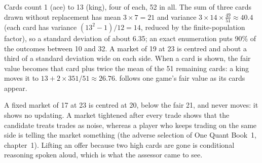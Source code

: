 \begin{example}\label{ex:iv:the-final-round-and-trading-games:cards}
Cards count 1 (ace) to 13 (king), four of each, 52 in all. The sum of three cards drawn without replacement
has mean $3 \times 7 = 21$ and variance $3 \times 14 \times \tfrac{49}{51} \approx 40.4$ (each card has
variance $(13^2 - 1)/12 = 14$, reduced by the finite-population factor), so a standard deviation of about 6.35;
an exact enumeration puts 90\% of the outcomes between 10 and 32. A market of 19 at 23 is centred and about a
third of a standard deviation wide on each side. When a card is shown, the fair value becomes that card plus
twice the mean of the 51 remaining cards: a king moves it to $13 + 2 \times 351/51 \approx 26.76$.
 follows one game's fair value as its cards appear.
\end{example}

\begin{omfigure}

\label{fig:iv:the-final-round-and-trading-games:game}
\end{omfigure}

\begin{remark}\label{rem:iv:the-final-round-and-trading-games:hook}
A fixed market of 17 at 23 is centred at 20, below the fair 21, and never moves: it shows no updating. A
market tightened after every trade shows that the candidate treats trades as noise, whereas a player who
keeps trading on the same side is telling the market something (the adverse selection of One Quant Book~1,
chapter~1). Lifting an offer because two high cards are gone is conditional reasoning spoken aloud, which is
what the assessor came to see.
\end{remark}

